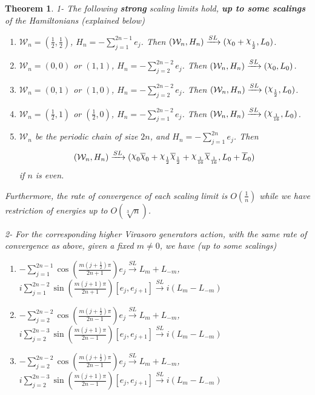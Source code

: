 \documentclass[twoside,11pt,titlepage]{amsart}
\renewcommand{\=}[1]{\stackrel{#1}{=}} %
\newtheorem{thm}{Theorem}[section]
\theoremstyle{definition}
\theoremstyle{remark}
\DeclareRobustCommand{\rchi}{{\mathpalette\irchi\relax}}
\newcommand{\irchi}[2]{\raisebox{\depth}{$#1\chi$}}
\begin{document}
\begin{thm}\label{thm3.1}
1- The following \textbf{strong} scaling limits hold, \textbf{up to some scalings} of the Hamiltonians (explained below)
\begin{enumerate}
    \item $\mathcal{W}_{n}=(\frac{1}{2},\frac{1}{2})$, $H_{n}=-\sum_{j=1}^{2n-1}e_j$. Then $(\mathcal{W}_{n},H_{n}) \xrightarrow{SL} (\rchi_0+\rchi_{\frac{1}{2}},L_0)$. 
    \item $\mathcal{W}_{n}=(0,0)$ or $(1,1)$, $H_{n}=-\sum_{j=2}^{2n-2}e_j$. Then $(\mathcal{W}_{n},H_{n})\xrightarrow{SL}(\rchi_{0},L_0)$. 
    \item $\mathcal{W}_{n}=(0,1)$ or $(1,0)$, $H_{n}=-\sum_{j=2}^{2n-2}e_j$. Then $(\mathcal{W}_{n},H_{n})\xrightarrow{SL}(\rchi_{\frac{1}{2}},L_0)$. 
    \item $\mathcal{W}_{n}=(\frac{1}{2},1)$ or $(\frac{1}{2},0)$, $H_{n}=-\sum_{j=1}^{2n-2}e_j$. Then $(\mathcal{W}_{n},H_{n})\xrightarrow{SL}(\rchi_{\frac{1}{16}},L_0)$. 
    \item $\mathcal{W}_{n}$ be the periodic chain of size $2n$, and $H_{n}=-\sum_{j=1}^{2n}e_j$. Then $$(\mathcal{W}_{n},H_{n})\xrightarrow{SL}(\rchi_0\overline{\rchi}_0+\rchi_{\frac{1}{2}}\overline{\rchi}_{\frac{1}{2}}+\rchi_{\frac{1}{16}}\overline{\rchi}_{\frac{1}{16}},L_0+\overline{L}_0)$$ if $n$ is even. 
\end{enumerate}
Furthermore, the rate of convergence of each scaling limit is $O(\frac{1}{n})$ while we have restriction of energies up to $O(\sqrt[3]{n})$. 

2- For the corresponding higher Virasoro generators action, with the same rate of convergence as above, given a fixed $m \neq 0$, we have (up to some scalings)
\begin{enumerate}
    \item $-\sum_{j=1}^{2n-1}\cos(\frac{m(j+\frac{1}{2})\pi}{2n+1})e_j\xrightarrow{SL}L_m+L_{-m}$, \\
    $i\sum_{j=1}^{2n-2}\sin(\frac{m(j+1)\pi}{2n+1})[e_j,e_{j+1}]\xrightarrow{SL}i(L_m-L_{-m})$
    
    \item $-\sum_{j=2}^{2n-2}\cos(\frac{m(j+\frac{1}{2})\pi}{2n-1})e_j\xrightarrow{SL}L_m+L_{-m}$, \\
    $i\sum_{j=2}^{2n-3}\sin(\frac{m(j+1)\pi}{2n-1})[e_j,e_{j+1}]\xrightarrow{SL}i(L_m-L_{-m})$
    
    \item $-\sum_{j=2}^{2n-2}\cos(\frac{m(j+\frac{1}{2})\pi}{2n-1})e_j\xrightarrow{SL}L_m+L_{-m}$, \\
    $i\sum_{j=2}^{2n-3}\sin(\frac{m(j+1)\pi}{2n-1})[e_j,e_{j+1}]\xrightarrow{SL}i(L_m-L_{-m})$
    

\end{enumerate}
\end{thm}
\end{document}
